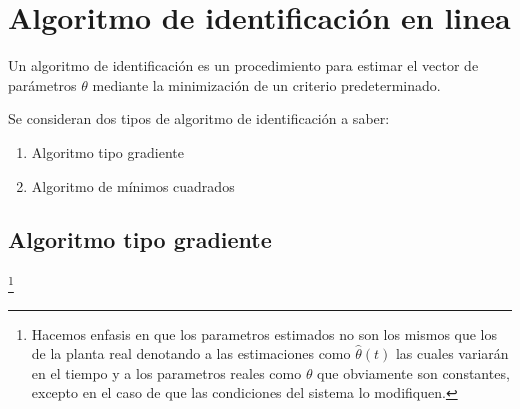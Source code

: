 
    \newpage
    \section{Algoritmo de identificación en linea}

        Un algoritmo de identificación es un procedimiento para estimar el vector de parámetros $\theta$ mediante la minimización de un criterio predeterminado.

        Se consideran dos tipos de algoritmo de identificación a saber:

        \begin{enumerate}
            \item Algoritmo tipo gradiente
            \item Algoritmo de mínimos cuadrados
        \end{enumerate}


        \subsection{Algoritmo tipo gradiente}\footnote{Hacemos enfasis en que los parametros estimados no son los mismos que los de la planta real denotando a las estimaciones como $\hat{\theta}(t)$ las cuales variarán en el tiempo y a los parametros reales como $\theta$ que obviamente son constantes, excepto en el caso de que las condiciones del sistema lo modifiquen.}

